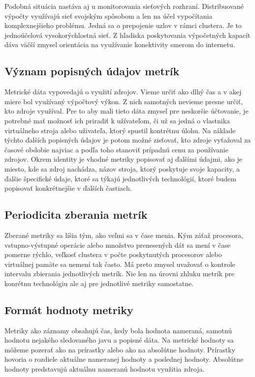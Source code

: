 \documentclass[11pt,final,oneside]{fithesis}
\begin{document}
Podobná situácia nastáva aj u monitorovania sieťových rozhraní. Distribuované výpočty využívajú sieť svojským spôsobom a len na účel vypočítania komplexnejšieho problému. Jedná sa o prepojenie
uzlov v rámci clustera. Je to jednoúčelová vysokorýchlostná sieť. Z hľadiska poskytovania výpočetných kapacít dáva väčší zmysel orientácia na využívanie konektivity smerom do internetu. 

\subsection{Význam popisných údajov metrík}
Metrické dáta vypovedajú o využití zdrojov. Vieme určiť ako dlhý čas a v akej miere bol využívaný výpočtový výkon. Z nich samotných nevieme presne určiť, kto zdroje využíval. Pre to aby mali tieto dáta zmysel 
pre neskoršie účtovanie, je potrebné mať možnosť ich priradiť k užívateľom, či už sa jedná o vlastnika virtuálneho stroja alebo uživateľa, ktorý spustil kontrétnu úlohu. Na základe týchto ďalších popisných  údajov je potom 
možné zisťovať, kto zdroje vyťažoval za časové obdobie najviac a podľa toho stanoviť prípadnú cenu za používanie zdrojov. Okrem identity je vhodné metriky popisovať aj ďalšími údajmi, ako je miesto, kde
sa zdroj nachádza, názov stroja, ktorý poskytuje svoje kapacity, a ďalšie špecifické údaje, ktoré sa týkajú jednotlivých technológií, ktoré budem popisovať konkrétnejšie v ďalších častiach.

\subsection{Periodicita zberania metrík}
Zberané metriky sa líšia tým, ako veľmi sa v čase menia. Kým záťaž procesora, vstupno-výstupné operácie alebo množstvo prenesených dát sa mení v čase pomerne rýchlo, veľkosť clustera v počte poskytnutých procesorov 
alebo virtuálnej pamäte sa nemení tak často. Má preto zmysel uvažovať o kontrole intervalu zbierania jednotlivých metrík. Nie len na úrovni zhluku metrík pre konrétnu technológiu ale aj pre jednotlivé metriky samostatne.

\subsection{Formát hodnoty metriky}
Metriky ako záznamy obsahujú čas, kedy bola hodnota nameraná, samotnú hodnotu nejakého sledovaného javu a popisné dáta. Na metrické
hodnoty sa môžeme pozerať ako na prírastky alebo ako na absolútne hodnoty. Prírastky hovoria o rozdiele aktuálne nameranej hodnoty 
a poslednej hodnoty. Absolútne hodnoty predstavujú aktuálnu nameranú hodnotu využitia zdroja. 
\end{document}
